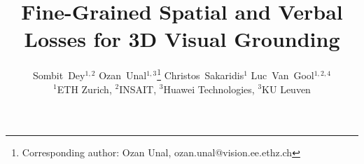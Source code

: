 \documentclass[10pt,twocolumn,letterpaper]{article}
\begin{document}
\title{Fine-Grained Spatial and Verbal Losses for 3D Visual Grounding}

\author{Sombit~Dey$^{1,2}$ \hspace{10px} Ozan~Unal$^{1,3}$\thanks{Corresponding author: Ozan Unal, ozan.unal@vision.ee.ethz.ch}
 \hspace{10px}
Christos~Sakaridis$^1$ \hspace{10px} Luc~Van~Gool$^{1,2,4}$
\\
$^1$ETH Zurich, $^2$INSAIT, $^3$Huawei Technologies, $^3$KU Leuven \\
}

\maketitle
\end{document}
